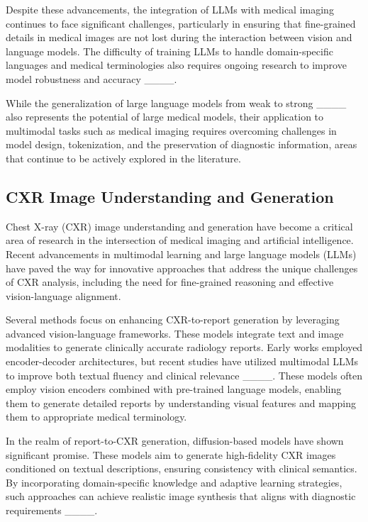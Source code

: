 Despite these advancements, the integration of LLMs with medical imaging continues to face significant challenges, particularly in ensuring that fine-grained details in medical images are not lost during the interaction between vision and language models. The difficulty of training LLMs to handle domain-specific languages and medical terminologies also requires ongoing research to improve model robustness and accuracy ____. 

While the generalization of large language models from weak to strong ____ also represents the potential of large medical models, their application to multimodal tasks such as medical imaging requires overcoming challenges in model design, tokenization, and the preservation of diagnostic information, areas that continue to be actively explored in the literature.

\subsection{CXR Image Understanding and Generation}

Chest X-ray (CXR) image understanding and generation have become a critical area of research in the intersection of medical imaging and artificial intelligence. Recent advancements in multimodal learning and large language models (LLMs) have paved the way for innovative approaches that address the unique challenges of CXR analysis, including the need for fine-grained reasoning and effective vision-language alignment.

Several methods focus on enhancing CXR-to-report generation by leveraging advanced vision-language frameworks. These models integrate text and image modalities to generate clinically accurate radiology reports. Early works employed encoder-decoder architectures, but recent studies have utilized multimodal LLMs to improve both textual fluency and clinical relevance ____. These models often employ vision encoders combined with pre-trained language models, enabling them to generate detailed reports by understanding visual features and mapping them to appropriate medical terminology.

In the realm of report-to-CXR generation, diffusion-based models have shown significant promise. These models aim to generate high-fidelity CXR images conditioned on textual descriptions, ensuring consistency with clinical semantics. By incorporating domain-specific knowledge and adaptive learning strategies, such approaches can achieve realistic image synthesis that aligns with diagnostic requirements ____.

